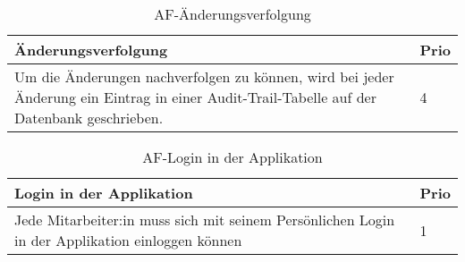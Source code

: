\begin{table}[H]
  \centering
  \settowidth{}
  \setlength\extrarowheight{2pt}
  \begin{tabulary}{1.0\textwidth}{|m{16cm}|L|}
    \hline
    \textbf{Änderungsverfolgung}&\textbf{Prio}\\
    \hline
     Um die Änderungen nachverfolgen zu können, wird bei jeder Änderung ein Eintrag in einer Audit-Trail-Tabelle auf der Datenbank geschrieben. & 4\\
    \hline
  \end{tabulary}
  \caption{AF-Änderungsverfolgung}
  \label{afAenderungsverfolgung}
\end{table}

\begin{table}[H]
  \centering
  \settowidth{}
  \setlength\extrarowheight{2pt}
  \begin{tabulary}{1.0\textwidth}{|m{16cm}|L|}
    \hline
    \textbf{Login in der Applikation}&\textbf{Prio}\\
    \hline
    Jede Mitarbeiter:in muss sich mit seinem Persönlichen Login in der Applikation einloggen können & 1\\
    \hline
  \end{tabulary}
  \caption{AF-Login in der Applikation}
  \label{afLogininderApplikatio}
\end{table}
